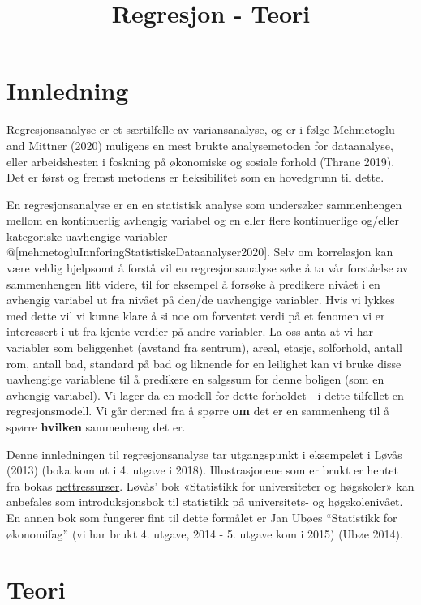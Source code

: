 \documentclass[
]{article}
\title{Regresjon - Teori}
\author{}
\date{\vspace{-2.5em}}
\begin{document}
\maketitle

\hypertarget{innledning}{%
\section{Innledning}\label{innledning}}

Regresjonsanalyse er et særtilfelle av variansanalyse, og er i følge
Mehmetoglu and Mittner (2020) muligens en mest brukte analysemetoden for
dataanalyse, eller arbeidshesten i foskning på økonomiske og sosiale
forhold (Thrane 2019). Det er først og fremst metodens er fleksibilitet
som en hovedgrunn til dette.

En regresjonsanalyse er en en statistisk analyse som undersøker
sammenhengen mellom en kontinuerlig avhengig variabel og en eller flere
kontinuerlige og/eller kategoriske uavhengige variabler
@{[}mehmetogluInnforingStatistiskeDataanalyser2020{]}. Selv om
korrelasjon kan være veldig hjelpsomt å forstå vil en regresjonsanalyse
søke å ta vår forståelse av sammenhengen litt videre, til for eksempel å
forsøke å predikere nivået i en avhengig variabel ut fra nivået på
den/de uavhengige variabler. Hvis vi lykkes med dette vil vi kunne klare
å si noe om forventet verdi på et fenomen vi er interessert i ut fra
kjente verdier på andre variabler. La oss anta at vi har variabler som
beliggenhet (avstand fra sentrum), areal, etasje, solforhold, antall
rom, antall bad, standard på bad og liknende for en leilighet kan vi
bruke disse uavhengige variablene til å predikere en salgssum for denne
boligen (som en avhengig variabel). Vi lager da en modell for dette
forholdet - i dette tilfellet en regresjonsmodell. Vi går dermed fra å
spørre \textbf{om} det er en sammenheng til å spørre \textbf{hvilken}
sammenheng det er.

Denne innledningen til regresjonsanalyse tar utgangspunkt i eksempelet i
Løvås (2013) (boka kom ut i 4. utgave i 2018). Illustrasjonene som er
brukt er hentet fra bokas
\href{www.nettressurser.no/statistikk}{nettressurser}. Løvås' bok
«Statistikk for universiteter og høgskoler» kan anbefales som
introduksjonsbok til statistikk på universitets- og høgskolenivået. En
annen bok som fungerer fint til dette formålet er Jan Ubøes ``Statistikk
for økonomifag'' (vi har brukt 4. utgave, 2014 - 5. utgave kom i 2015)
(Ubøe 2014).

\hypertarget{teori}{%
\section{Teori}\label{teori}}
\end{document}
